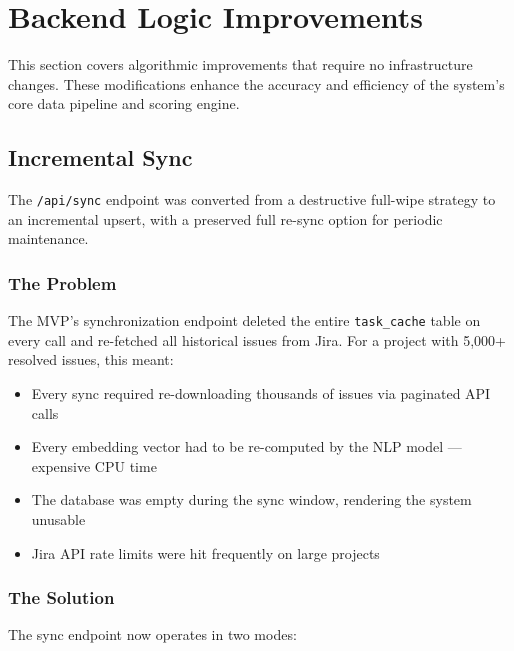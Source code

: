 \documentclass[12pt, a4paper]{article}
\begin{document}
\section{Backend Logic Improvements}

This section covers algorithmic improvements that require no infrastructure changes. These modifications enhance the accuracy and efficiency of the system's core data pipeline and scoring engine.

\subsection{Incremental Sync}

The \texttt{/api/sync} endpoint was converted from a destructive full-wipe strategy to an incremental upsert, with a preserved full re-sync option for periodic maintenance.

\subsubsection{The Problem}

The MVP's synchronization endpoint deleted the entire \texttt{task\_cache} table on every call and re-fetched all historical issues from Jira. For a project with 5{,}000+ resolved issues, this meant:

\begin{itemize}
    \item Every sync required re-downloading thousands of issues via paginated API calls
    \item Every embedding vector had to be re-computed by the NLP model — expensive CPU time
    \item The database was empty during the sync window, rendering the system unusable
    \item Jira API rate limits were hit frequently on large projects
\end{itemize}

\subsubsection{The Solution}

The sync endpoint now operates in two modes:
\end{document}
